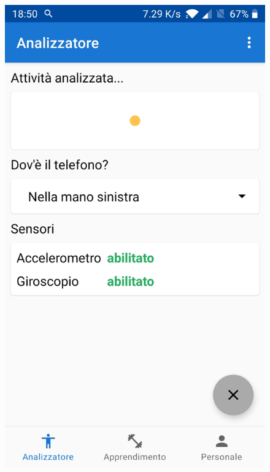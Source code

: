 \begin{figure}[H]
    \includegraphics[scale = 0.1019]{assets/images/screenshots/1c_Analysis.jpg}

\end{figure}
